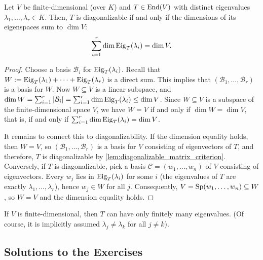 \begin{corollary}\label{cor:diagonalizability_eigenspaces}
  Let $V$ be finite-di\-men\-sional (over $K$) and $T \in \operatorname{End}(V)$ with distinct eigenvalues $\lambda_1, \dots, \lambda_r \in K$. Then, $T$ is diagonalizable if and only if the dimensions of its eigenspaces sum to $\dim V$:
  \[ \sum_{i=1}^r \dim \operatorname{Eig}_T(\lambda_i) = \dim V. \]
\end{corollary}

\begin{proof}
  Choose a basis $\mathcal{B}_i$ for $\operatorname{Eig}_T(\lambda_i)$. Recall that $W := \operatorname{Eig}_T(\lambda_1) + \dots + \operatorname{Eig}_T(\lambda_r)$ is a direct sum.
  This implies that $(\mathcal{B}_1, \dots, \mathcal{B}_r)$ is a basis for $W$.
  Now $W \subseteq V$ is a linear subspace, and $\dim W = \sum_{i=1}^r |\mathcal{B}_i| = \sum_{i=1}^r \dim \operatorname{Eig}_T(\lambda_i) \le \dim V$.
  Since $W \subseteq V$ is a subspace of the finite-di\-men\-sional space $V$, we have $W = V$ if and only if $\dim W = \dim V$, that is, if and only if $\sum_{i=1}^r \dim \operatorname{Eig}_T(\lambda_i) = \dim V$.

  It remains to connect this to diagonalizability. If the dimension equality holds, then $W = V$, so $(\mathcal{B}_1, \dots, \mathcal{B}_r)$ is a basis for $V$ consisting of eigenvectors of $T$, and therefore, $T$ is diagonalizable by \cref{lem:diagonalizable_matrix_criterion}. Conversely, if $T$ is diagonalizable, pick a basis $\mathcal{C} = (w_1, \dots, w_n)$ of $V$ consisting of eigenvectors. Every $w_j$ lies in $\operatorname{Eig}_T(\lambda_i)$ for some $i$ (the eigenvalues of $T$ are exactly $\lambda_1, \dots, \lambda_r$), hence $w_j \in W$ for all $j$. Consequently, $V = \operatorname{Sp}(w_1, \dots, w_n) \subseteq W$, so $W = V$ and the dimension equality holds.
\end{proof}

\begin{exercise}\label{ex:finite_eigenvalues}
  If $V$ is finite-di\-men\-sional, then $T$ can have only finitely many eigenvalues. (Of course, it is implicitly assumed $\lambda_j \ne \lambda_k$ for all $j \ne k$).
\end{exercise}

\subsection{Solutions to the Exercises}
\label{sec:solutions_eigen_motivation}

